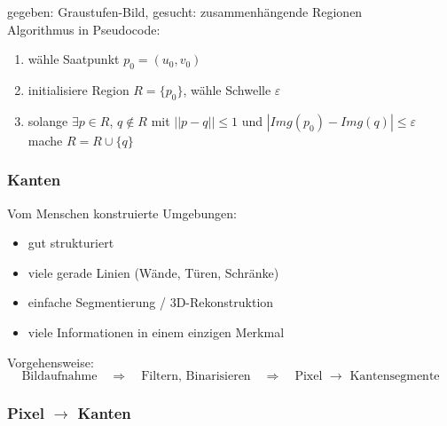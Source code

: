 gegeben: Graustufen-Bild, gesucht: zusammenhängende Regionen \\ Algorithmus in Pseudocode:
\begin{enumerate}
\item wähle Saatpunkt $p_0 = (u_0,v_0)$
\item initialisiere Region $R = \{ p_0 \}$, wähle Schwelle $\varepsilon$
\item solange $\exists p \in R$, $q \not\in R$ mit $||p-q|| \leq 1$ und $|Img(p_0) - Img(q)| \leq \varepsilon$ mache $R = R \cup \{ q \}$
\end{enumerate}

\subsubsection{Kanten}

Vom Menschen konstruierte Umgebungen:
\begin{itemize}
\item gut strukturiert
\item viele gerade Linien (Wände, Türen, Schränke)
\item einfache Segmentierung / 3D-Rekonstruktion
\item viele Informationen in einem einzigen Merkmal
\end{itemize}
Vorgehensweise: $$\textrm{Bildaufnahme} \quad \Rightarrow \quad \textrm{Filtern, Binarisieren} \quad \Rightarrow \quad \textrm{Pixel } \to \textrm{ Kantensegmente}$$

\subsubsection*{Pixel $\to$ Kanten}

